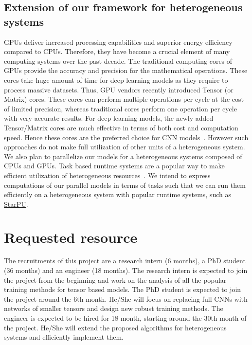 \documentclass[11pt]{article}
\begin{document}
\subsection{Extension of our framework for heterogeneous systems}
GPUs deliver increased processing capabilities and superior energy efficiency compared to CPUs. Therefore, they have become a crucial element of many computing systems over the past decade. The traditional computing cores of GPUs provide the accuracy and precision for the mathematical operations. These cores take huge amount of time for deep learning models as they require to process massive datasets. Thus, GPU vendors recently introduced Tensor (or Matrix) cores. These cores can perform multiple operations per cycle at the cost of limited precision, whereas traditional cores perform one operation per cycle with very accurate results. For deep learning models, the newly added Tensor/Matrix cores are much effective in terms of both cost and computation speed. Hence these cores are the preferred choice for CNN models~\cite{KSH-Resnet-2017}. However such approaches do not make full utilization of other units of a heterogeneous system. We also plan to parallelize our models for a heterogeneous systems composed of CPUs and GPUs. Task based runtime systems are a popular way to make efficient utilization of heterogeneous resources~\cite{ATNW-Euro-Par-2009}. We intend to express computations of our parallel models in terms of tasks such that we can run them efficiently on a heterogeneous system with popular runtime systems, such as \href{https://starpu.gitlabpages.inria.fr}{StarPU}.



\section{Requested resource}
The recruitments of this project are a research intern (6 months), a PhD student  (36 months) and an engineer (18 months). The  research intern is expected to join the project from the beginning and work on the analysis of all the popular training methods for tensor based models. The PhD student is expected to join the project around the 6th month. He/She will focus on replacing full CNNs  with networks of smaller tensors and design new robust training methods. The engineer is expected to be hired for 18 month, starting around the 30th month of the project. He/She will extend the proposed algorithms for heterogeneous systems and efficiently implement them. 
\end{document}
